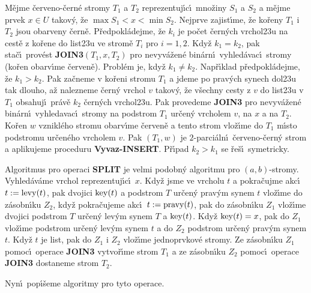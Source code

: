 \flushpar M\v ejme \v cerveno-\v cern\'e stromy $T_1$ a $T_2$ reprezentuj\'\i c\'\i\ 
mno\v ziny $S_1$ a $S_2$ a m\v ejme prvek $x\in U$ takov\'y, \v ze 
$\max S_1<x<\min S_2$.  Nejprve zajist\'\i me, \v ze ko\v reny $T_
1$ i $T_2$ jsou 
obarveny \v cern\v e.  P\v redpokl\'adejme, \v ze $k_i$ je po\v cet \v cern\'ych 
vrchol\accent23u na cest\v e z ko\v rene do list\accent23u ve strom\v e 
$T_i$ pro $i=1,2$.  Kdy\v z $k_1=k_2$, pak sta\v c\'\i\ prov\'est {\bf JOIN3$
(T_1,x,T_2)$ }
pro nevyv\'a\v zen\'e bin\'arn\'\i\ vyhled\'avac\'\i\ stromy (ko\v ren obarv\'\i me 
\v cerven\v e).  Probl\'em je, kdy\v z $k_1\ne k_2$.  Nap\v r\'\i klad 
p\v redpokl\'adejme, \v ze $k_1>k_2$.  Pak za\v cneme v ko\v reni stromu $
T_1$ a 
jdeme po prav\'ych synech dol\accent23u tak dlouho, a\v z nalezneme 
\v cern\'y vrchol $v$ takov\'y, \v ze v\v sechny cesty z $v$ do list\accent23u 
v $T_1$ obsahuj\'\i\ pr\'av\v e $k_2$ \v cern\'ych vrchol\accent23u.  Pak 
provedeme {\bf JOIN3} pro nevyv\'a\v zen\'e bin\'arn\'\i\ vyhledavac\'\i\ stromy 
na podstrom $T_1$ ur\v cen\'y vrcholem $v$, na $x$ a na $T_2$. Ko\v ren $
w$ 
vznikl\'eho stromu obarv\'\i me \v cerven\v e a tento strom vlo\v z\'\i me do 
$T_1$ m\'\i sto podstromu ur\v cen\'eho vrcholem $v$. Pak $(T_1,w
)$ je 
$2$-parci\'aln\'\i\ \v cerveno-\v cern\'y strom a aplikujeme proceduru 
{\bf Vyvaz-INSERT}. P\v r\'\i pad $k_2>k_1$ se \v re\v s\'\i\ symetricky. 
\medskip

\flushpar Algoritmus pro operaci {\bf SPLIT} je velmi podobn\'y 
algoritmu pro $(a,b)$-stromy. Vy\-hled\'av\'a\-me vrchol 
reprezentuj\'\i c\'\i\ $x$. Kdy\v z jsme ve vrcholu $t$ a pokra\v cujme akc\'\i\ 
$t:=\operatorname{levy}(t)$, pak dvojici $\operatorname{key}(t)$ a podstrom $T$ ur\v cen\'y prav\'ym 
synem $t$ vlo\v z\'\i me do z\'asobn\'\i ku $Z_2$, kdy\v z pokra\v cujeme akc\'\i\ 
$t:=\operatorname{pravy}(t)$, pak do z\'asobn\'\i ku $Z_1$ vlo\v z\'\i me dvojici podstrom $
T$ 
ur\v cen\'y lev\'ym synem $T$ a $\operatorname{key}(t)$. Kdy\v z $\operatorname{key}(t)=x$, pak do $
Z_1$ 
vlo\v z\'\i me podstrom ur\v cen\'y lev\'ym synem $t$ a do $Z_2$ podstrom 
ur\v cen\'y prav\'ym synem $t$. Kdy\v z $t$ je list, pak do $Z_1$ i $
Z_2$ vlo\v z\'\i me 
jednoprvkov\'e stromy. Ze z\'asobn\'\i ku $Z_1$ pomoc\'\i\ operace {\bf JOIN3 }
vytvo\v r\'\i me strom $T_1$ a ze z\'asobn\'\i ku $Z_2$ pomoc\'\i\ operace {\bf JOIN3 }
dostaneme strom $T_2$. 
\medskip

\flushpar Nyn\'\i\ pop\'\i\v seme algoritmy pro tyto operace.
\medskip

